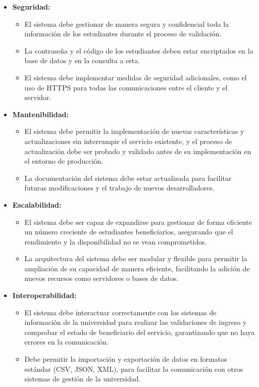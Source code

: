 \documentclass[stu, 12pt, letterpaper, donotrepeattitle, floatsintext, natbib]{apa7}
\begin{document}
\begin{itemize}
	\item \textbf{Seguridad:}
	\begin{itemize}
		\item El sistema debe gestionar de manera segura y confidencial toda la información de los estudiantes durante el proceso de validación.
		
		\item La contraseña y el código de los estudiantes deben estar encriptados en la base de datos y en la consulta a esta.
		
		\item El sistema debe implementar medidas de seguridad adicionales, como el uso de HTTPS para todas las comunicaciones entre el cliente y el servidor.
	\end{itemize}
	
	\item \textbf{Mantenibilidad:}
	\begin{itemize}
		\item El sistema debe permitir la implementación de nuevas características y actualizaciones sin interrumpir el servicio existente, y el proceso de actualización debe ser probado y validado antes de su implementación en el entorno de producción.
		
		\item La documentación del sistema debe estar actualizada para facilitar futuras modificaciones y el trabajo de nuevos desarrolladores.
	\end{itemize}
	
	\item \textbf{Escalabilidad:}
	\begin{itemize}
		\item El sistema debe ser capaz de expandirse para gestionar de forma eficiente un número creciente de estudiantes beneficiarios, asegurando que el rendimiento y la disponibilidad no se vean comprometidos.
		
		\item La arquitectura del sistema debe ser modular y flexible para permitir la ampliación de su capacidad de manera eficiente, facilitando la adición de nuevos recursos como servidores o bases de datos.
	\end{itemize}
	
	\item \textbf{Interoperabilidad:}
	\begin{itemize}
		\item El sistema debe interactuar correctamente con los sistemas de información de la universidad para realizar las validaciones de ingreso y comprobar el estado de beneficiario del servicio, garantizando que no haya errores en la comunicación.
		
		\item Debe permitir la importación y exportación de datos en formatos estándar (CSV, JSON, XML), para facilitar la comunicación con otros sistemas de gestión de la universidad.
	\end{itemize}
\end{itemize}
\end{document}
